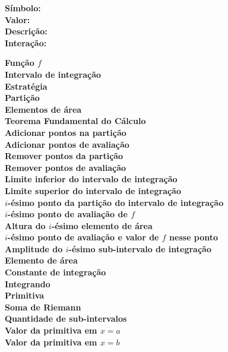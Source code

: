 \documentclass[a4paper,10pt]{scrartcl}
\begin{document}
    
    \textbf{Símbolo:}\\
      \textbf{Valor:}\\
      \textbf{Descrição:}\\
     \textbf{Interação:}\par\vspace{5mm}
     \large
    \textbf{Função $f$}\\
    \textbf{Intervalo de integração}\\
    \textbf{Estratégia}\\
    \textbf{Partição}\\
    \textbf{Elementos de área}\\
    \textbf{Teorema Fundamental do Cálculo} \\
    \textbf{Adicionar pontos na partição}    \\
    \textbf{Adicionar pontos de avaliação}    \\
    \textbf{Remover pontos da partição}    \\
    \textbf{Remover pontos de avaliação}    \\
    \textbf{Limite inferior do intervalo de integração}\\
    \textbf{Limite superior do intervalo de integração}\\
    \textbf{$i$-ésimo ponto da partição do intervalo de integração}\\
    \textbf{$i$-ésimo ponto de avaliação de $f$}\\
    \textbf{Altura do $i$-ésimo elemento de área}\\
    \textbf{$i$-ésimo ponto de avaliação e valor de $f$ nesse ponto}\\
    \textbf{Amplitude do $i$-ésimo sub-intervalo de integração}\\
    \textbf{Elemento de área}\\
    \textbf{Constante de integração}\\
    \textbf{Integrando}\\
    \textbf{Primitiva}\\
    \textbf{Soma de Riemann}\\
    \textbf{Quantidade de sub-intervalos}\\
    \textbf{Valor da primitiva em $x = a$}\\
    \textbf{Valor da primitiva em $x = b$}
    
\end{document}
